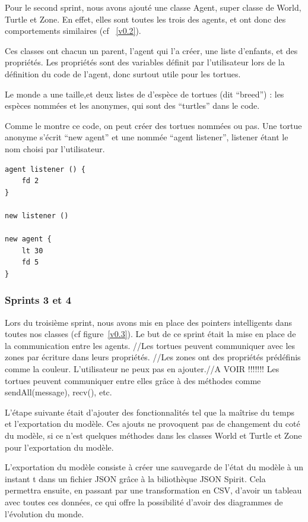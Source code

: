 Pour le second sprint, nous avons ajouté une classe Agent, super classe de World, Turtle et Zone. En effet, elles sont toutes les trois des agents, et ont donc des comportements similaires (cf ~\ref{v0.2}).

Ces classes ont chacun un parent, l'agent qui l'a créer, une liste d'enfants, et des propriétés. Les propriétés sont des variables définit par l'utilisateur lors de la définition du code de l'agent, donc surtout utile pour les tortues.

Le monde a une taille,et deux listes de d'espèce de tortues (dit \enquote{breed}) : les espèces nommées et les anonymes, qui sont des \enquote{turtles} dans le code.

Comme le montre ce code, on peut créer des tortues nommées ou pas. Une tortue anonyme s'écrit \enquote{new agent} et une nommée \enquote{agent listener}, listener étant le nom choisi par l'utilisateur.

\begin{lstlisting}[language=Stibbons]
agent listener () {
	fd 2
}

new listener ()

new agent {
	lt 30
	fd 5
}
\end{lstlisting}
\subsubsection{Sprints 3 et 4}
Lors du troisième sprint, nous avons mis en place des pointers intelligents dans toutes nos classes (cf figure~\ref{v0.3}). Le but de ce sprint était la mise en place de la communication entre les agents. //Les tortues peuvent communiquer avec les zones par écriture dans leurs propriétés. //Les zones ont des propriétés prédéfinis comme la couleur. L'utilisateur ne peux pas en ajouter.//A VOIR !!!!!!! Les tortues peuvent communiquer entre elles grâce à des méthodes comme sendAll(message), recv(), etc.

L'étape suivante était d'ajouter des fonctionnalités tel que la maîtrise du temps et l'exportation du modèle. Ces ajouts ne provoquent pas de changement du coté du modèle, si ce n'est quelques méthodes dans les classes World et Turtle et Zone pour l'exportation du modèle.

L'exportation du modèle consiste à créer une sauvegarde de l'état du modèle à un instant t dans un fichier JSON grâce à la biliothèque JSON Spirit.
Cela permettra ensuite, en passant par une transformation en CSV, d'avoir un tableau avec toutes ces données, ce qui offre la possibilité d'avoir des diagrammes de l'évolution du monde.

